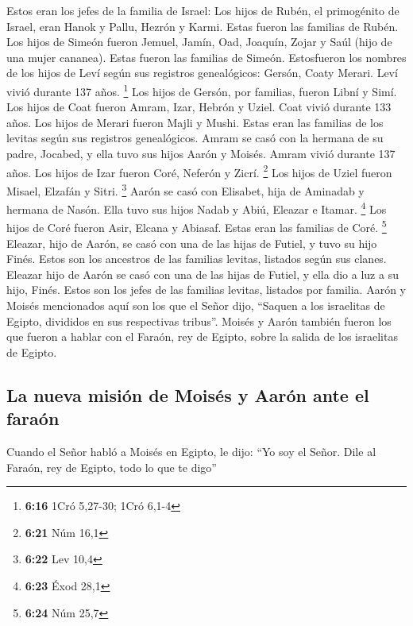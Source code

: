  Estos eran los jefes de la familia de Israel: Los hijos
de Rubén, el primogénito de Israel, eran Hanok y Pallu, Hezrón y Karmi.
Estas fueron las familias de Rubén.  Los hijos de Simeón
fueron Jemuel, Jamín, Oad, Joaquín, Zojar y Saúl (hijo de una mujer
cananea). Estas fueron las familias de Simeón. 
Estosfueron los nombres de los hijos de Leví según sus registros
genealógicos: Gersón, Coaty Merari. Leví vivió durante 137 años.
\footnote{\textbf{6:16} 1Cró 5,27-30; 1Cró 6,1-4}  Los
hijos de Gersón, por familias, fueron Libní y Simí.  Los
hijos de Coat fueron Amram, Izar, Hebrón y Uziel. Coat vivió durante 133
años.  Los hijos de Merari fueron Majli y Mushi. Estas
eran las familias de los levitas según sus registros genealógicos.
 Amram se casó con la hermana de su padre, Jocabed, y
ella tuvo sus hijos Aarón y Moisés. Amram vivió durante 137 años.
 Los hijos de Izar fueron Coré, Neferón y Zicrí.
\footnote{\textbf{6:21} Núm 16,1}  Los hijos de Uziel
fueron Misael, Elzafán y Sitri. \footnote{\textbf{6:22} Lev 10,4}
 Aarón se casó con Elisabet, hija de Aminadab y hermana
de Nasón. Ella tuvo sus hijos Nadab y Abiú, Eleazar e Itamar.
\footnote{\textbf{6:23} Éxod 28,1}  Los hijos de Coré
fueron Asir, Elcana y Abiasaf. Estas eran las familias de Coré.
\footnote{\textbf{6:24} Núm 25,7}  Eleazar, hijo de
Aarón, se casó con una de las hijas de Futiel, y tuvo su hijo Finés.
Estos son los ancestros de las familias levitas, listados según sus
clanes. Eleazar hijo de Aarón se casó con una de las hijas de Futiel, y
ella dio a luz a su hijo, Finés. Estos son los jefes de las familias
levitas, listados por familia.  Aarón y Moisés
mencionados aquí son los que el Señor dijo, ``Saquen a los israelitas de
Egipto, divididos en sus respectivas tribus''.  Moisés y
Aarón también fueron los que fueron a hablar con el Faraón, rey de
Egipto, sobre la salida de los israelitas de Egipto.

\hypertarget{la-nueva-misiuxf3n-de-moisuxe9s-y-aaruxf3n-ante-el-farauxf3n}{%
\subsection{La nueva misión de Moisés y Aarón ante el
faraón}\label{la-nueva-misiuxf3n-de-moisuxe9s-y-aaruxf3n-ante-el-farauxf3n}}

 Cuando el Señor habló a Moisés en Egipto,
 le dijo: ``Yo soy el Señor. Dile al Faraón, rey de
Egipto, todo lo que te digo''


